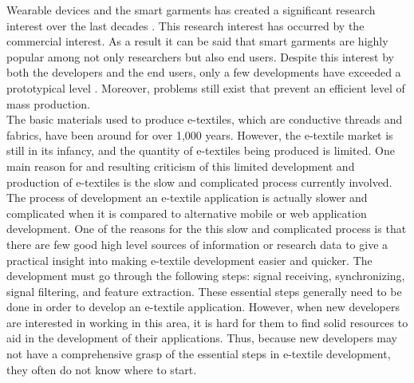 	Wearable devices and the smart garments has created a significant research interest over the last decades \cite{2}. This research interest has occurred by the commercial interest. As a result it can be said that smart garments are highly popular among not only researchers but also end users. Despite this interest by both the developers and the end users, only a few developments have exceeded a prototypical level \cite{2}. Moreover, problems still exist that prevent an efficient level of mass production. 
	\\	
	
The basic materials used to produce e-textiles, which are conductive threads and fabrics, have been around for over 1,000 years. However, the e-textile market is still in its infancy, and the quantity of e-textiles being produced is limited. One main reason for and resulting criticism of this limited development and production of e-textiles is the slow and complicated process currently involved. 
\\
	
	
	The process of development an e-textile application is actually slower and complicated when it is compared to alternative mobile or web application development. One of the reasons for the this slow and complicated process is that there are few good high level sources of information or research data to give a practical insight into making e-textile development easier and quicker. The development must go through the following steps: signal receiving, synchronizing, signal filtering, and feature extraction. These essential steps generally need to be done in order to develop an e-textile application. However, when new developers are interested in working in this area, it is hard for them to find solid resources to aid in the development of their applications. Thus, because new developers may not have a comprehensive grasp of the essential steps in e-textile development, they often do not know where to start. 
	\\
	
